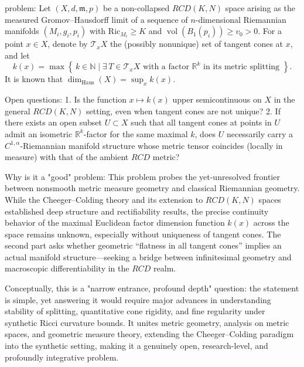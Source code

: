problem:  
Let \((X, d, \mathfrak{m}, p)\) be a non-collapsed \(RCD(K,N)\) space arising as the measured Gromov–Hausdorff limit of a sequence of \(n\)-dimensional Riemannian manifolds \((M_i,g_i,p_i)\) with \(\mathrm{Ric}_{M_i} \ge K\) and \(\operatorname{vol}(B_1(p_i)) \ge v_0 > 0\).  
For a point \(x \in X\), denote by \(\mathcal{T}_x X\) the (possibly nonunique) set of tangent cones at \(x\), and let  
\[
k(x) = \max \left\{ \, k \in \mathbb{N} \mid \exists\, T \in \mathcal{T}_x X \text{ with a factor } \mathbb{R}^k \text{ in its metric splitting } \right\}.
\]  
It is known that \(\dim_{\mathrm{Haus}}(X) = \sup_x k(x)\).  

Open questions:  
1. Is the function \(x \mapsto k(x)\) upper semicontinuous on \(X\) in the general \(RCD(K,N)\) setting, even when tangent cones are not unique?  
2. If there exists an open subset \(U \subset X\) such that all tangent cones at points in \(U\) admit an isometric \(\mathbb{R}^k\)-factor for the same maximal \(k\), does \(U\) necessarily carry a \(C^{1,\alpha}\)-Riemannian manifold structure whose metric tensor coincides (locally in measure) with that of the ambient \(RCD\) metric?  

Why is it a "good" problem:  
This problem probes the yet-unresolved frontier between nonsmooth metric measure geometry and classical Riemannian geometry. While the Cheeger–Colding theory and its extension to \(RCD(K,N)\) spaces established deep structure and rectifiability results, the precise continuity behavior of the maximal Euclidean factor dimension function \(k(x)\) across the space remains unknown, especially without uniqueness of tangent cones. The second part asks whether geometric “flatness in all tangent cones” implies an actual manifold structure—seeking a bridge between infinitesimal geometry and macroscopic differentiability in the \(RCD\) realm.  

Conceptually, this is a "narrow entrance, profound depth" question: the statement is simple, yet answering it would require major advances in understanding stability of splitting, quantitative cone rigidity, and fine regularity under synthetic Ricci curvature bounds. It unites metric geometry, analysis on metric spaces, and geometric measure theory, extending the Cheeger–Colding paradigm into the synthetic setting, making it a genuinely open, research-level, and profoundly integrative problem.